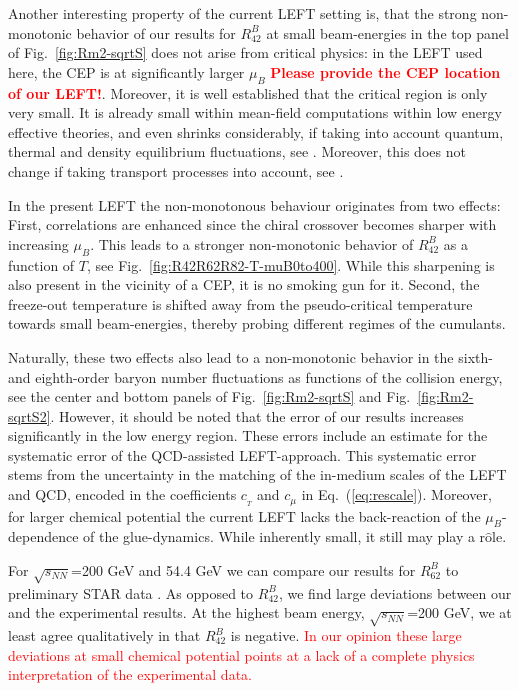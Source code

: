 \documentclass[%
reprint,
superscriptaddress,
showpacs,preprintnumbers,
amsmath,amssymb,
aps,
prd,
]{revtex4-1}
\def\Fig#1{Fig.~\ref{#1}} \def\Tab#1{Tab.~\ref{#1}}
\def\Eq#1{Eq.~(\ref{#1})}
\newcommand{\coljan}[1]{\textcolor{red}{#1}}
\begin{document}
Another interesting property of the current LEFT setting is, that the strong non-monotonic behavior of our results for $R^{B}_{42}$ at small  beam-energies in the top panel of \Fig{fig:Rm2-sqrtS} does not arise from critical physics: in the LEFT used here, the CEP is at significantly larger $\mu_B$ \coljan{ \bf Please provide the CEP location of our LEFT!}. Moreover, it is well established that the critical region is only very small. It is already small within mean-field computations within low energy effective theories, and even shrinks considerably, if taking into account quantum, thermal and density equilibrium fluctuations, see \cite{Schaefer:2006ds}. Moreover, this does not change if taking transport processes into account, see 
\cite{Bluhm:2018qkf}. 

In the present LEFT the non-monotonous behaviour originates from two effects: First, correlations are enhanced since the chiral crossover becomes sharper with increasing $\mu_B$. This leads to a stronger non-monotonic behavior of $R^{B}_{42}$ as a function of $T$, see \Fig{fig:R42R62R82-T-muB0to400}. While this sharpening is also present in the vicinity of a CEP, it is no smoking gun for it. Second, the freeze-out temperature is shifted away from the pseudo-critical temperature towards small beam-energies, thereby probing different regimes of the cumulants. 
	
Naturally, these two effects also lead to a non-monotonic behavior in the sixth- and eighth-order baryon number fluctuations as functions of the collision energy, see the center and bottom panels of \Fig{fig:Rm2-sqrtS} and \Fig{fig:Rm2-sqrtS2}. However, it should be noted that the error of our results increases significantly in the low energy region. These errors include an estimate for the  systematic error of the QCD-assisted LEFT-approach. This systematic error stems from the uncertainty in the matching of the in-medium scales of the LEFT and QCD, encoded in the coefficients $c_{_{T}}$ and $c_{\mu}$ in \Eq{eq:rescale}. Moreover, for larger chemical potential the current LEFT lacks the back-reaction of the $\mu_B$-dependence of the glue-dynamics. While inherently small, it still may play a r$\hat{\textrm{o}}$le. 

For $\sqrt{s_{NN}}$=200 GeV and 54.4 GeV we can compare our results for $R^{B}_{62}$ to preliminary STAR data \cite{Nonaka:2020crv,Pandav:2020uzx}. As opposed to $R^{B}_{42}$, we find large deviations between our and the experimental results. At the highest beam energy, $\sqrt{s_{NN}}$=200 GeV, we at least agree qualitatively in that $R^{B}_{42}$ is negative. \coljan{In our opinion these large deviations at small chemical potential points at a lack of a complete physics interpretation of the experimental data. }
	
\end{document}
